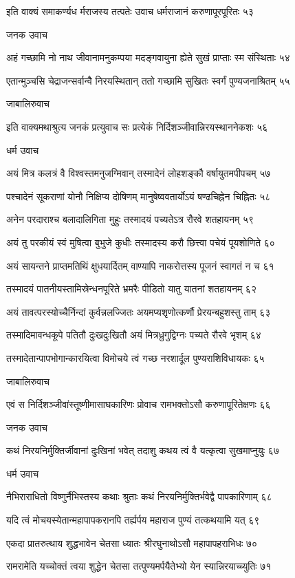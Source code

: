 इति वाक्यं समाकर्ण्यध र्मराजस्य तत्पतेः
उवाच धर्मराजानं करुणापूरपूरितः ५३

जनक उवाच

अहं गच्छामि नो नाथ जीवानामनुकम्पया
मदङ्गवायुना ह्येते सुखं प्राप्ताः स्म संस्थिताः ५४

एतान्मुञ्चसि चेद्राजन्सर्वान्वै निरयस्थितान्
ततो गच्छामि सुखितः स्वर्गं पुण्यजनाश्रितम् ५५

जाबालिरुवाच

इति वाक्यमथाश्रुत्य जनकं प्रत्युवाच सः
प्रत्येकं निर्दिशञ्जीवान्निरयस्थाननेकशः ५६

धर्म उवाच

अयं मित्र कलत्रं वै विश्वस्तमनुजग्मिवान्
तस्मादेनं लोहशङ्कौ वर्षायुतमपीपचम् ५७

पश्चादेनं सूकराणां योनौ निक्षिप्य दोषिणम्
मानुषेष्ववतार्योऽयं षण्ढचिह्नेन चिह्नितः ५८

अनेन परदाराश्च बलादालिगिता मुहुः
तस्मादयं पच्यतेऽत्र रौरवे शतहायनम् ५९

अयं तु परकीयं स्वं मुषित्वा बुभुजे कुधीः
तस्मादस्य करौ छित्त्वा पचेयं पूयशोणिते ६०

अयं सायन्तने प्राप्तमतिथिं क्षुधयार्दितम्
वाण्यापि नाकरोत्तस्य पूजनं स्वागतं न च ६१

तस्मादयं पातनीयस्तामिस्रेन्धनपूरिते
भ्रमरैः पीडितो यातु यातनां शतहायनम् ६२

अयं तावत्परस्योच्चैर्निन्दां कुर्वन्नलज्जितः
अयमप्यशृणोत्कर्णौ प्रेरयन्बहुशस्तु ताम् ६३

तस्मादिमावन्धकूपे पतितौ दुःखदुःखितौ
अयं मित्रध्रुगुद्विग्नः पच्यते रौरवे भृशम् ६४

तस्मादेतान्पापभोगान्कारयित्वा विमोचये
त्वं गच्छ नरशार्दूल पुण्यराशिविधायकः ६५

जाबालिरुवाच

एवं स निर्दिशञ्जीवांस्तूष्णीमासाघकारिणः
प्रोवाच रामभक्तोऽसौ करुणापूरितेक्षणः ६६

जनक उवाच

कथं निरयनिर्मुक्तिर्जीवानां दुःखिनां भवेत्
तदाशु कथय त्वं वै यत्कृत्वा सुखमाप्नुयुः ६७

धर्म उवाच

नैभिराराधितो विष्णुर्नैभिस्तस्य कथाः श्रुताः
कथं निरयनिर्मुक्तिर्भवेद्वै पापकारिणाम् ६८

यदि त्वं मोचयस्येतान्महापापकरानपि
तर्ह्यर्पय महाराज पुण्यं तत्कथयामि यत् ६९

एकदा प्रातरुत्थाय शुद्धभावेन चेतसा
ध्यातः श्रीरघुनाथोऽसौ महापापहराभिधः ७०

रामरामेति यच्चोक्तं त्वया शुद्धेन चेतसा
तत्पुण्यमर्पयैतेभ्यो येन स्यान्निरयाच्च्युतिः ७१

